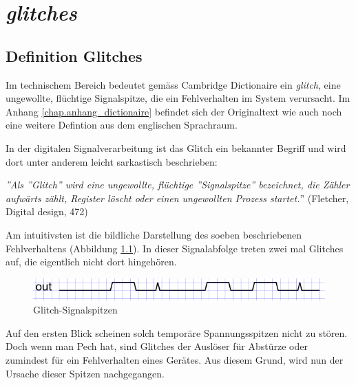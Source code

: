 
\chapter{\textit{glitches}}\label{chap.glitch}

\section{Definition Glitches}\label{sect.glitch_def}

Im technischem Bereich bedeutet gemäss Cambridge Dictionaire ein \textit{glitch}, eine ungewollte, flüchtige Signalspitze, die ein Fehlverhalten im System verursacht. Im Anhang \ref{chap.anhang_dictionaire} befindet sich der Originaltext wie auch noch eine weitere Defintion aus dem englischen Sprachraum.

In der digitalen Signalverarbeitung ist das Glitch ein bekannter Begriff und wird dort unter anderem leicht sarkastisch beschrieben:

\textit{''Als ''Glitch''  wird eine ungewollte, flüchtige ''Signalspitze'' bezeichnet, die Zähler aufwärts zählt, Register löscht oder einen ungewollten Prozess startet.}'' \citep{key}
\cite{Fletcher1982}(Fletcher, Digital design, 472)

Am intuitivsten ist die bildliche Darstellung des soeben beschriebenen Fehlverhaltens (Abbildung \ref{fig.glitch.def}). In dieser Signalabfolge treten zwei mal Glitches auf, die eigentlich nicht dort hingehören.\\
\begin{figure}[H]
	\centering
	\includegraphics[width=\textwidth]{images/glitch/def_glitch_1.png}
	\caption{Glitch-Signalspitzen}
	\label{fig.glitch.def}
\end{figure}

Auf den ersten Blick scheinen solch temporäre Spannungsspitzen nicht zu stören. Doch wenn man Pech hat, sind Glitches der Auslöser für Abstürze oder zumindest für ein Fehlverhalten eines Gerätes. Aus diesem Grund, wird nun der Ursache dieser Spitzen nachgegangen.\\ 



